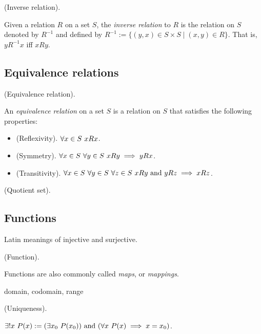 \begin{defn}
    (Inverse relation).

    Given a relation $R$ on a set $S$, the \textit{inverse relation} to $R$ is the relation on $S$ denoted by $R^{-1}$ and defined by $R^{-1} := \{(y, x) \in S \times S \mid (x, y) \in R\}$. That is, $yR^{-1}x$ iff $xRy$.
\end{defn}

\subsection*{Equivalence relations}

\begin{defn}
    (Equivalence relation).

    An \textit{equivalence relation} on a set $S$ is a relation on $S$ that satisfies the following properties:

    \begin{itemize}
        \item (Reflexivity). $\forall x \in S \text{ } xRx$.
        \item (Symmetry). $\forall x \in S \text{ } \forall y \in S \text{ } xRy \implies yRx$.
        \item (Transitivity). $\forall x \in S \text{ } \forall y \in S \text{ } \forall z \in S \text{ } xRy \text{ and } yRz \implies xRz$.
    \end{itemize}
\end{defn}

\begin{defn}
\label{ch::logic_pf_fns::defn::quotient_set}

    (Quotient set).
\end{defn}

\subsection*{Functions}

Latin meanings of injective and surjective.

\begin{defn}
    (Function).
    
    Functions are also commonly called \textit{maps}, or \textit{mappings}.
    
    domain, codomain, range
\end{defn}

\begin{defn}
    (Uniqueness).
    
    $\exists !x \text{ } P(x) := (\exists x_0 \text{ } P(x_0)) \text{ and } (\forall x \text{ } P(x) \implies x = x_0)$.
\end{defn}

